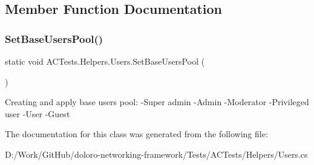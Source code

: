 \subsection{Member Function Documentation}
\mbox{\label{class_a_c_tests_1_1_helpers_1_1_users_a825c38d9936e2c662e837fff3f2ebd96}} 
\subsubsection{\texorpdfstring{Set\+Base\+Users\+Pool()}{SetBaseUsersPool()}}
{\footnotesize\ttfamily static void A\+C\+Tests.\+Helpers.\+Users.\+Set\+Base\+Users\+Pool (\begin{DoxyParamCaption}{ }\end{DoxyParamCaption})\hspace{0.3cm}{\ttfamily [static]}}



Creating and apply base users pool\+: -\/\+Super admin -\/\+Admin -\/\+Moderator -\/\+Privileged user -\/\+User -\/\+Guest 



The documentation for this class was generated from the following file\+:\begin{DoxyCompactItemize}
\item 
D\+:/\+Work/\+Git\+Hub/doloro-\/networking-\/framework/\+Tests/\+A\+C\+Tests/\+Helpers/Users.\+cs\end{DoxyCompactItemize}
